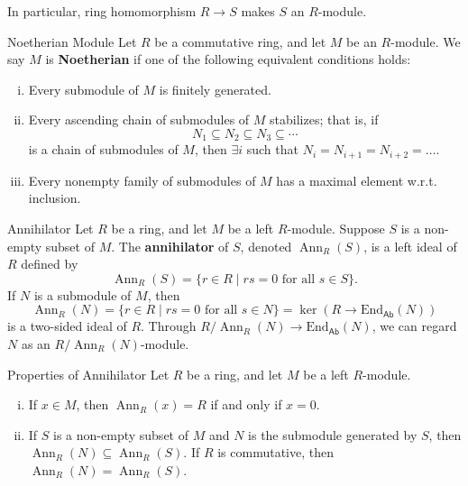 In particular, ring homomorphism $R\to S$ makes $S$ an $R$-module.

\begin{definition}{Noetherian Module}{}
Let $R$ be a commutative ring, and let $M$ be an $R$-module. We say $M$ is \textbf{Noetherian} if one of the following equivalent conditions holds:
\begin{enumerate}[(i)]
    \item Every submodule of $M$ is finitely generated.
    \item Every ascending chain of submodules of $M$ stabilizes; that is, if
    $$
    N_1 \subseteq N_2 \subseteq N_3 \subseteq \cdots
    $$
    is a chain of submodules of $M$, then $\exists i$ such that $N_i=N_{i+1}=N_{i+2}=\ldots$.
    \item Every nonempty family of submodules of $M$ has a maximal element w.r.t. inclusion.
\end{enumerate}
\end{definition}


\begin{definition}{Annihilator}{}
    Let $R$ be a ring, and let $M$ be a left $R$-module. Suppose $S$ is a non-empty subset of $M$. The \textbf{annihilator} of $S$, denoted $\operatorname{Ann}_R(S)$, is a left ideal of $R$ defined by 
    $$
    \operatorname{Ann}_R(S)=\{r \in R \mid r s=0 \text { for all } s \in S\}.
    $$
    If $N$ is a submodule of $M$, then 
    \[
        \operatorname{Ann}_R(N)=\{r \in R \mid r s=0 \text { for all } s \in N\}=\ker \left(R\longrightarrow\mathrm{End}_{\mathsf{Ab}}\left(N\right)\right)  
    \]
    is a two-sided ideal of $R$. Through $R/\operatorname{Ann}_R(N)\to \mathrm{End}_{\mathsf{Ab}}\left(N\right)$, we can regard $N$ as an $R/\operatorname{Ann}_R(N)$-module.
\end{definition}

\begin{proposition}{Properties of Annihilator}{}
    Let $R$ be a ring, and let $M$ be a left $R$-module. 
    \begin{enumerate}[(i)]
        \item If $x\in M$, then $\operatorname{Ann}_R(x)=R$ if and only if $x=0$.
        \item If $S$ is a non-empty subset of $M$ and $N$ is the submodule generated by $S$, then $\operatorname{Ann}_R(N)\subseteq \operatorname{Ann}_R(S)$. If $R$ is commutative, then $\operatorname{Ann}_R(N)= \operatorname{Ann}_R(S)$.
    \end{enumerate}
\end{proposition}


